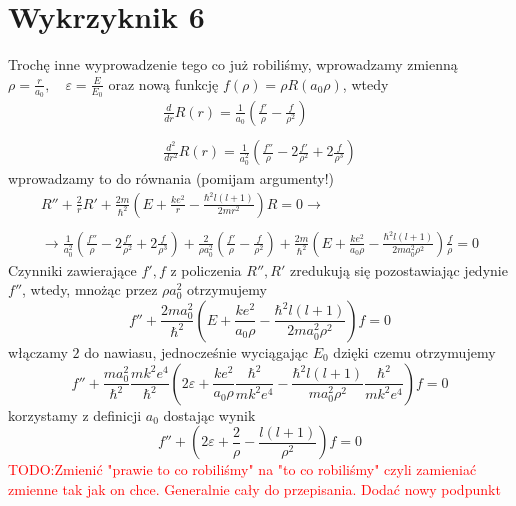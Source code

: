 \documentclass[a4paper,12pt]{article}
\newcommand\myworries[1]{\textcolor{red}{#1}} %
\begin{document}
\section{Wykrzyknik 6}
Trochę inne wyprowadzenie tego co już robiliśmy, wprowadzamy zmienną $\rho = \frac{r}{a_0},\quad \varepsilon = \frac{E}{E_0}$ oraz nową funkcję
$f(\rho) = \rho R(a_0 \rho)$, wtedy
$$
\begin{array}{l}
	\frac{d}{dr}R(r) = \frac{1}{a_0}\left(\frac{f'}{\rho} - \frac{f}{\rho^2}\right)\\\\
	\frac{d^2}{dr^2}R(r) = \frac{1}{a_0^2}\left(\frac{f''}{\rho}-2\frac{f'}{\rho^2}+2\frac{f}{\rho^3}\right)
\end{array}
$$
wprowadzamy to do równania (pomijam argumenty!)
$$
\begin{array}{l}
	R'' +\frac{2}{r}R' + \frac{2m}{\hbar^2}\left(E+\frac{ke^2}{r}-\frac{\hbar^2l(l+1)}{2mr^2}\right)R = 0 \to \\\\
	\to \frac{1}{a_0^2}\left(\frac{f''}{\rho}-2\frac{f'}{\rho^2}+2\frac{f}{\rho^3}\right) + \frac{2}{\rho a_0^2}\left(\frac{f'}{\rho} - \frac{f}{\rho^2}\right)
	+\frac{2m}{\hbar^2}\left(E+\frac{ke^2}{a_0\rho}-\frac{\hbar^2l(l+1)}{2ma_0^2\rho^2}\right)\frac{f}{\rho} = 0
\end{array}
$$
Czynniki zawierające $f', f$ z policzenia $R'',R'$ zredukują się pozostawiając jedynie $f''$, wtedy, mnożąc przez $\rho a_0^2$ otrzymujemy
$$
	f''  +\frac{2ma_0^2}{\hbar^2}\left(E+\frac{ke^2}{a_0\rho}-\frac{\hbar^2l(l+1)}{2ma_0^2\rho^2}\right)f = 0
$$
włączamy $2$ do nawiasu, jednocześnie wyciągając $E_0$ dzięki czemu otrzymujemy
$$
	f''  +\frac{ma_0^2}{\hbar^2}\frac{mk^2e^4}{\hbar^2}\left(2\varepsilon+\frac{ke^2}{a_0\rho}\frac{\hbar^2}{mk^2e^4}-\frac{\hbar^2l(l+1)}{ma_0^2\rho^2}\frac{\hbar^2}{mk^2e^4}\right)f = 0
$$
korzystamy z definicji $a_0$ dostając wynik 
$$
	f'' + \left(2\varepsilon+\frac{2}{\rho}- \frac{l(l+1)}{\rho^2}\right)f = 0
$$
\myworries{TODO:Zmienić "prawie to co robiliśmy" na "to co robiliśmy" czyli zamieniać zmienne tak jak on chce. Generalnie cały do przepisania. Dodać nowy podpunkt}
\end{document}

